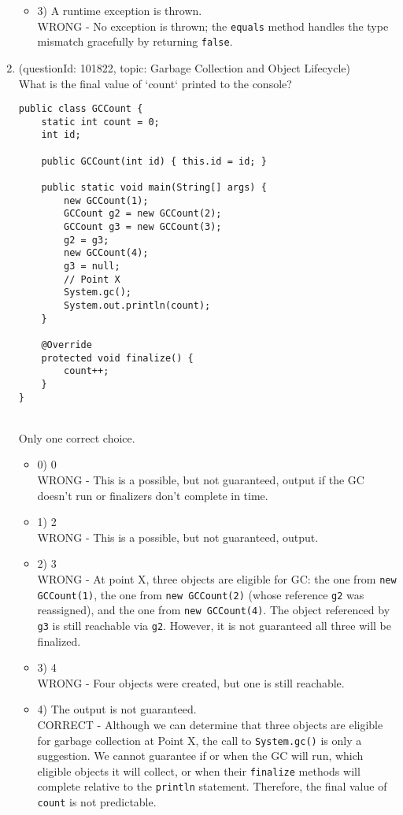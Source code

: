 \documentclass[12pt]{article}
\begin{document}
\begin{enumerate}[label=(\arabic*)]
\begin{itemize}
\item 3) A runtime exception is thrown.
 \\ 
WRONG - No exception is thrown; the \verb|equals| method handles the type mismatch gracefully by returning \verb|false|.

\end{itemize}
\item (questionId: 101822, topic: Garbage Collection and Object Lifecycle) \\ 
What is the final value of `count` printed to the console?
\begin{verbatim}
public class GCCount {
    static int count = 0;
    int id;

    public GCCount(int id) { this.id = id; }

    public static void main(String[] args) {
        new GCCount(1);
        GCCount g2 = new GCCount(2);
        GCCount g3 = new GCCount(3);
        g2 = g3;
        new GCCount(4);
        g3 = null;
        // Point X
        System.gc();
        System.out.println(count);
    }

    @Override
    protected void finalize() {
        count++;
    }
}
\end{verbatim}
\\ \noindent Only one correct choice. 
\begin{itemize}
\item 0) 0
 \\ 
WRONG - This is a possible, but not guaranteed, output if the GC doesn't run or finalizers don't complete in time.

\item 1) 2
 \\ 
WRONG - This is a possible, but not guaranteed, output.

\item 2) 3
 \\ 
WRONG - At point X, three objects are eligible for GC: the one from \verb|new GCCount(1)|, the one from \verb|new GCCount(2)| (whose reference \verb|g2| was reassigned), and the one from \verb|new GCCount(4)|. The object referenced by \verb|g3| is still reachable via \verb|g2|. However, it is not guaranteed all three will be finalized.

\item 3) 4
 \\ 
WRONG - Four objects were created, but one is still reachable.

\item 4) The output is not guaranteed.
 \\ 
CORRECT - Although we can determine that three objects are eligible for garbage collection at Point X, the call to \verb|System.gc()| is only a suggestion. We cannot guarantee if or when the GC will run, which eligible objects it will collect, or when their \verb|finalize| methods will complete relative to the \verb|println| statement. Therefore, the final value of \verb|count| is not predictable.


\end{itemize}
\end{enumerate}
\end{document}
